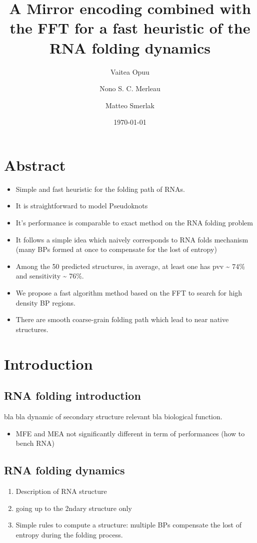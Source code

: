 \documentclass[a4paper,12pt]{article}
\author[1]{Vaitea Opuu}
\author[1]{Nono S. C. Merleau}
\author[1]{Matteo Smerlak}
\affil[1]{Max Planck Institute for Mathematics in the Sciences, D-04103 Leipzig, Germany}
\date{\today}
\title{A Mirror encoding combined with the FFT for a fast heuristic of the RNA folding dynamics}
\begin{document}
\maketitle

\section{Abstract}
\label{sec:org03f64b1}
\begin{itemize}
\item Simple and fast heuristic for the folding path of RNAs.
\item It is straightforward to model Pseudoknots
\item It's performance is comparable to exact method on the RNA folding problem
\item It follows a simple idea which naively corresponds to RNA folds mechanism
(many BPs formed at once to compensate for the lost of entropy)
\item Among the 50 predicted structures, in average, at least one has pvv \textasciitilde{} 74\% and
sensitivity \textasciitilde{} 76\%.
\item We propose a fast algorithm method based on the FFT to search for high density
BP regions.
\item There are smooth coarse-grain folding path which lead to near native structures.
\end{itemize}

\clearpage
\section{Introduction}
\label{sec:org614aaae}
\subsection{RNA folding introduction}
\label{sec:org8769818}
bla bla dynamic of secondary structure relevant bla biological function.

\begin{itemize}
\item MFE and MEA not significantly different in term of performances (how to bench RNA)
\end{itemize}

\subsection{RNA folding dynamics}
\label{sec:orgbcb036b}
\begin{enumerate}
\item Description of RNA structure
\item going up to the 2ndary structure only
\item Simple rules to compute a structure: multiple BPs compensate the lost of
entropy during the folding process.
\end{enumerate}
\end{document}
